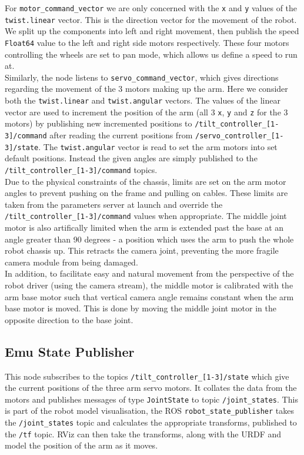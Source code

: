\documentclass[titlepage,12pt,a4paper]{article}
\begin{document}
\noindent For \texttt{motor\_command\_vector} we are only concerned with the \texttt{x} and \texttt{y} values of the \texttt{twist.linear} vector. This is the direction vector for the movement of the robot. We split up the components into left and right movement, then publish the speed \texttt{Float64} value to the left and right side motors respectively. These four motors controlling the wheels are set to pan mode, which allows us define a speed to run at.\\

\noindent Similarly, the node listens to \texttt{servo\_command\_vector}, which gives directions regarding the movement of the 3 motors making up the arm. Here we consider both the \texttt{twist.linear} and \texttt{twist.angular} vectors. The values of the linear vector are used to increment the position of the arm (all 3 \texttt{x}, \texttt{y} and \texttt{z} for the 3 motors) by publishing new incremented positions to \texttt{/tilt\_controller\_[1-3]/command} after reading the current positions from \texttt{/servo\_controller\_[1-3]/state}. The \texttt{twist.angular} vector is read to set the arm motors into set default positions. Instead the given angles are simply published to the \texttt{/tilt\_controller\_[1-3]/command} topics. \\

\noindent Due to the physical constraints of the chassis, limits are set on the arm motor angles to prevent pushing on the frame and pulling on cables. These limits are taken from the parameters server at launch and override the \texttt{/tilt\_controller\_[1-3]/command} values when appropriate. The middle joint motor is also artifically limited when the arm is extended past the base at an angle greater than 90 degrees - a position which uses the arm to push the whole robot chassis up. This retracts the camera joint, preventing the more fragile camera module from being damaged.\\

\noindent In addition, to facilitate easy and natural movement from the perspective of the robot driver (using the camera stream), the middle motor is calibrated with the arm base motor such that vertical camera angle remains constant when the arm base motor is moved. This is done by moving the middle joint motor in the opposite direction to the base joint.\\

\subsection{Emu State Publisher}
This node subscribes to the topics \texttt{/tilt\_controller\_[1-3]/state} which give the current positions of the three arm servo motors. It collates the data from the motors and publishes messages of type \texttt{JointState} to topic \texttt{/joint\_states}. This is part of the robot model visualisation, the ROS \texttt{robot\_state\_publisher} takes the \texttt{/joint\_states} topic and calculates the appropriate transforms, published to the \texttt{/tf} topic. RViz can then take the transforms, along with the URDF and model the position of the arm as it moves. \\
\end{document}
